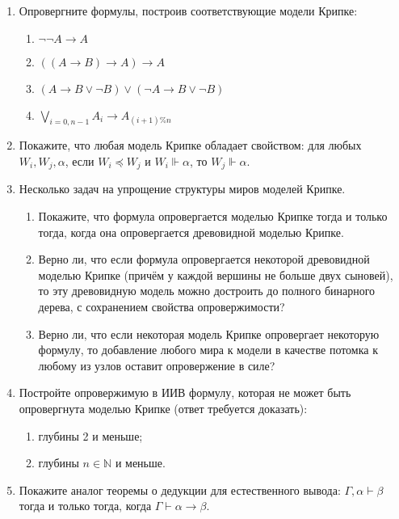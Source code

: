 \documentclass[10pt,a4paper,oneside]{article}
\begin{document}
\begin{enumerate}
\item Опровергните формулы, построив соответствующие модели Крипке:

\begin{enumerate}
\item $\neg\neg A \rightarrow A$
\item $((A \rightarrow B) \rightarrow A) \rightarrow A$
\item $(A \rightarrow B \vee \neg B) \vee (\neg A \rightarrow B \vee \neg B)$
\item $\bigvee_{i=0,n-1} A_i \rightarrow A_{(i+1) \% n}$
\end{enumerate}

\item Покажите, что любая модель Крипке обладает свойством: для любых $W_i, W_j, \alpha$, 
если $W_i \preceq W_j$ и $W_i \Vdash \alpha$, то $W_j \Vdash \alpha$.

\item Несколько задач на упрощение структуры миров моделей Крипке.
\begin{enumerate}
\item Покажите, что формула опровергается моделью Крипке тогда и только тогда, когда она
опровергается древовидной моделью Крипке.

\item Верно ли, что если формула опровергается некоторой древовидной моделью Крипке (причём
у каждой вершины не больше двух сыновей), то эту 
древовидную модель можно достроить до полного бинарного дерева, с сохранением свойства опровержимости?

\item Верно ли, что если некоторая модель Крипке опровергает некоторую формулу,
то добавление любого мира к модели в качестве потомка к любому из узлов оставит опровержение в силе?
\end{enumerate}

\item Постройте опровержимую в ИИВ формулу, которая не может быть опровергнута моделью Крипке (ответ требуется доказать):
\begin{enumerate}
\item глубины 2 и меньше;
\item глубины $n \in \mathbb{N}$ и меньше.
\end{enumerate}

\item Покажите аналог теоремы о дедукции для естественного вывода: $\Gamma,\alpha\vdash\beta$ тогда и только тогда, когда
$\Gamma\vdash\alpha\rightarrow\beta$.



\end{enumerate}
\end{document}
